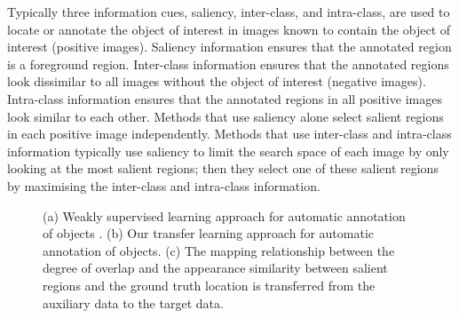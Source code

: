 \documentclass{bmvc2k}
\begin{document}
Typically three information cues, saliency, inter-class, and intra-class, are used to locate or annotate the object of interest in images known to contain the object of interest (positive images). Saliency information ensures that the annotated region is a foreground region. Inter-class information ensures that the annotated regions look dissimilar to all images without the object of interest (negative images). Intra-class information ensures that the annotated regions in all positive images look similar to each other. Methods that use saliency alone \citep{Alexewhatisobject} select salient regions in each positive image independently. Methods that use inter-class and intra-class information \cite{Deselaerslocalizing2010,Sivaiccv2011} typically use saliency to limit the search space of each image by only looking at the most salient regions; then they select one of these salient regions by maximising the inter-class and intra-class information.





\begin{figure}
\begin{minipage}[b]{4cm}
\end{minipage}
\hspace{0.1cm}
\begin{minipage}[b]{4cm}
\end{minipage}
\hspace{0.1cm}
\begin{minipage}[b]{4cm}
\end{minipage}

\caption{  (a) Weakly supervised learning approach for automatic annotation of objects \cite{Deselaerslocalizing2010,Sivaiccv2011}. (b) Our transfer learning approach for automatic annotation of objects. (c) The mapping relationship between the degree of overlap and the appearance similarity between salient regions and the ground truth location is transferred from the auxiliary data to the target data.}
\label{fig:knowledge}
\end{figure}
\end{document}

